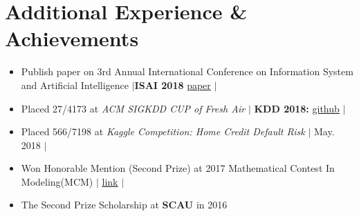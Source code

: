 \documentclass[letterpaper,10pt]{article}
\newcommand{\resumeSubHeadingListStart}{\begin{itemize}[leftmargin=*]}
\newcommand{\resumeSubHeadingListEnd}{\end{itemize}}
\newcommand{\shorterSection}[1]{\vspace{-10pt}\section{#1}}
\begin{document}
\shorterSection{Additional Experience \& Achievements}
  \resumeSubHeadingListStart
  \small
    \item{Publish paper on 3rd Annual International Conference on Information System and Artificial Intelligence } 
    $\vert$\textbf{ISAI 2018} 
     \href{http://iopscience.iop.org/article/10.1088/1742-6596/1069/1/012095}{\color{blue}\underline{paper}} $\vert$
    \vspace{-5pt}
     \item{Placed 27/4173 at  \textit{ACM SIGKDD CUP of Fresh Air} } $\vert$
  \textbf{KDD 2018:} \href{https://github.com/wuyujack/2018-ACM-SIGKDD-CUP-of-Fresh-Air-27th-Place-Solution}{\color{blue}\underline{github}} $\vert$
    \vspace{-5pt}   
     \item{Placed 566/7198 at  \textit{Kaggle Competition: Home Credit Default Risk} }
     $\vert$ May. 2018 $\vert$
    \vspace{-5pt}    
    
    \item{Won Honorable Mention (Second Prize) at 2017 Mathematical Contest In Modeling(MCM)
    $\vert$
    \href{https://www.comap.com/undergraduate/contests/mcm/contests/2017/results/2017_ICM_Problem_D_Results.pdf}{\color{blue}\underline{link}} $\vert$
}
    \vspace{-5pt}    
    
    
    \item{The Second Prize Scholarship at \textbf{SCAU} in 2016 }
    \vspace{-5pt}

  \resumeSubHeadingListEnd
\end{document}
